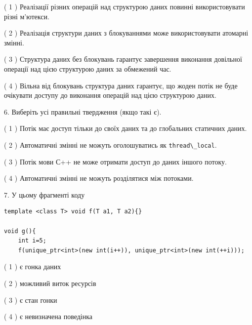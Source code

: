\documentclass[12pt, ukrainian]{article}
\def\code#1{\Verb!#1!}
\begin{document}
\begin {large}
{( 1 ) Реалізації різних операцій над структурою даних повинні використовувати різні м’ютекси.%

( 2 ) Реалізація структури даних з блокуваннями може використовувати атомарні змінні.%

( 3 ) Структура даних без блокувань гарантує завершення виконання довільної операції над цією структурою даних за обмежений час.%

( 4 ) Вільна від блокувань структура даних гарантує, що жоден потік не буде очікувати доступу до виконання операцій над цією структурою даних.%
\newpage



\vspace{5mm}
6. Виберіть усі правильні твердження (якщо такі є).\par
\vspace{2mm}

( 1 ) Потік має доступ тільки до своїх даних та до глобальних статичних даних.%

( 2 ) Автоматичні змінні не можуть оголошуватись як \code{thread\_local}.%

( 3 ) Потік мови С++ не може отримати доступ до даних іншого потоку.%

( 4 ) Автоматичні змінні не можуть розділятися між потоками.%


\vspace{5mm}
7. У цьому фрагменті коду
\begin{verbatim}
template <class T> void f(T a1, T a2){}

void g(){
    int i=5;
    f(unique_ptr<int>(new int(i++)), unique_ptr<int>(new int(++i)));
\end{verbatim}

( 1 ) є гонка даних%

( 2 ) можливий виток ресурсів%

( 3 ) є стан гонки%

( 4 ) є невизначена поведінка%
}
\end {large}
\end{document}
